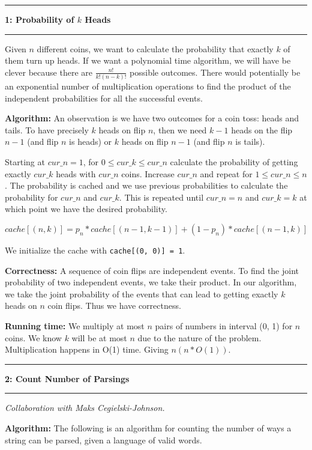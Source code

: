 \documentclass[11pt]{article}
\newcommand\question[2]{\vspace{.25in}\hrule\textbf{#1: #2}\vspace{.5em}\hrule\vspace{.10in}}
\newcommand\algorith{\vspace{.10in}\textbf{Algorithm: }}
\newcommand\correctness{\vspace{.10in}\textbf{Correctness: }}
\newcommand\runtime{\vspace{.10in}\textbf{Running time: }}
\begin{document}
\raggedright
\newcommand\NAME{Jake Pitkin}  %
\newcommand\UID{u0891770}     %
\newcommand\HWNUM{2}              %

\question{1}{Probability of $k$ Heads}
Given $n$ different coins, we want to calculate the probability that exactly $k$ of them turn up heads. If we want a polynomial time algorithm, we will have be clever because there are $\frac{n!}{k!(n-k)!}$ possible outcomes. There would potentially be an exponential number of multiplication operations to find the product of the independent probabilities for all the successful events.

\algorith An observation is we have two outcomes for a coin toss: heads and tails. To have precisely $k$ heads on flip $n$, then we need $k-1$ heads on the flip $n-1$ (and flip $n$ is heads) or $k$ heads on flip $n-1$ (and flip $n$ is tails).

	Starting at $cur\_n = 1$, for $0 \leq cur\_k \leq cur\_n$ calculate the probability of getting exactly $cur\_k$ heads with $cur\_n$ coins. Increase $cur\_n$ and repeat for $1 \leq cur\_n \leq n$. The probability is cached and we use previous probabilities to calculate the probability for $cur\_n$ and $cur\_k$. This is repeated until $cur\_n = n$ and $cur\_k = k$ at which point we have the desired probability.
	
	$$cache[(n, k)] = p_n * cache[(n-1, k-1)] + (1 - p_n) * cache[(n-1, k)]$$
	
	We initialize the cache with \texttt{cache[(0, 0)] = 1}.

\correctness A sequence of coin flips are independent events. To find the joint probability of two independent events, we take their product. In our algorithm, we take the joint probability of the events that can lead to getting exactly $k$ heads on $n$ coin flips. Thus we have correctness.

\runtime We multiply at most $n$ pairs of numbers in interval (0, 1) for $n$ coins. We know $k$ will be at most $n$ due to the nature of the problem. Multiplication happens in O(1) time. Giving $n(n * O(1))$.


\question{2}{Count Number of Parsings}
\textit{Collaboration with Maks Cegielski-Johnson.}

\algorith The following is an algorithm for counting the number of ways a string can be parsed, given a language of valid words.
\end{document}
